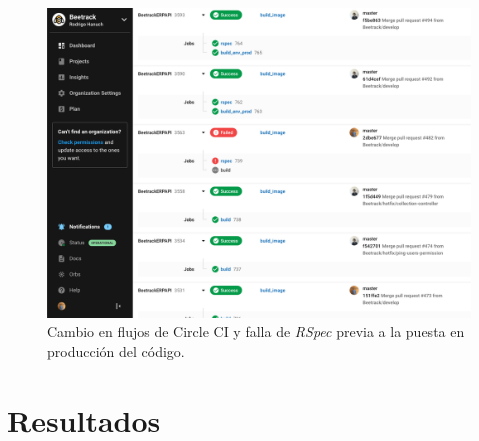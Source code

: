   \begin{figure}
    \centering
    \includegraphics[width=\linewidth]{figures/testing/circle_ci_flow.png}
    \caption{Cambio en flujos de Circle CI y falla de \textit{RSpec} previa a la puesta en producción del código.}
    \label{fig:flujo_circle_ci}
  \end{figure}

\section{Resultados}